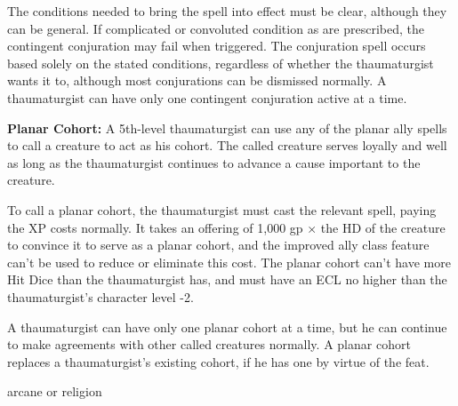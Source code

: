 {The conditions needed to bring the spell into effect must be clear, although they can be general. If complicated or convoluted condition as are prescribed, the contingent conjuration may fail when triggered. The conjuration spell occurs based solely on the stated conditions, regardless of whether the thaumaturgist wants it to, although most conjurations can be dismissed normally. A thaumaturgist can have only one contingent conjuration active at a time.

\textbf{Planar Cohort:} A 5th-level thaumaturgist can use any of the planar ally spells to call a creature to act as his cohort. The called creature serves loyally and well as long as the thaumaturgist continues to advance a cause important to the creature.

To call a planar cohort, the thaumaturgist must cast the relevant spell, paying the XP costs normally. It takes an offering of 1,000 gp × the HD of the creature to convince it to serve as a planar cohort, and the improved ally class feature can’t be used to reduce or eliminate this cost. The planar cohort can’t have more Hit Dice than the thaumaturgist has, and must have an ECL no higher than the thaumaturgist’s character level -2.

A thaumaturgist can have only one planar cohort at a time, but he can continue to make agreements with other called creatures normally. A planar cohort replaces a thaumaturgist’s existing cohort, if he has one by virtue of the  feat.
}
{}
{arcane or religion}
{}
{}
{}